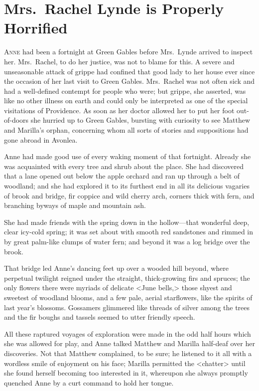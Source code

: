 \chapter{Mrs.~Rachel Lynde is Properly Horrified}

\lettrine[]{A}{nne} had been a fortnight at Green Gables before Mrs.~Lynde arrived to inspect her. Mrs.~Rachel, to do her justice, was not to blame for this. A severe and unseasonable attack of grippe had confined that good lady to her house ever since the occasion of her last visit to Green Gables. Mrs.~Rachel was not often sick and had a well-defined contempt for people who were; but grippe, she asserted, was like no other illness on earth and could only be interpreted as one of the special visitations of Providence. As soon as her doctor allowed her to put her foot out-of-doors she hurried up to Green Gables, bursting with curiosity to see Matthew and Marilla's orphan, concerning whom all sorts of stories and suppositions had gone abroad in Avonlea.

Anne had made good use of every waking moment of that fortnight. Already she was acquainted with every tree and shrub about the place. She had discovered that a lane opened out below the apple orchard and ran up through a belt of woodland; and she had explored it to its furthest end in all its delicious vagaries of brook and bridge, fir coppice and wild cherry arch, corners thick with fern, and branching byways of maple and mountain ash.

She had made friends with the spring down in the hollow—that wonderful deep, clear icy-cold spring; it was set about with smooth red sandstones and rimmed in by great palm-like clumps of water fern; and beyond it was a log bridge over the brook.

That bridge led Anne's dancing feet up over a wooded hill beyond, where perpetual twilight reigned under the straight, thick-growing firs and spruces; the only flowers there were myriads of delicate <June bells,> those shyest and sweetest of woodland blooms, and a few pale, aerial starflowers, like the spirits of last year's blossoms. Gossamers glimmered like threads of silver among the trees and the fir boughs and tassels seemed to utter friendly speech.

All these raptured voyages of exploration were made in the odd half hours which she was allowed for play, and Anne talked Matthew and Marilla half-deaf over her discoveries. Not that Matthew complained, to be sure; he listened to it all with a wordless smile of enjoyment on his face; Marilla permitted the <chatter> until she found herself becoming too interested in it, whereupon she always promptly quenched Anne by a curt command to hold her tongue.

